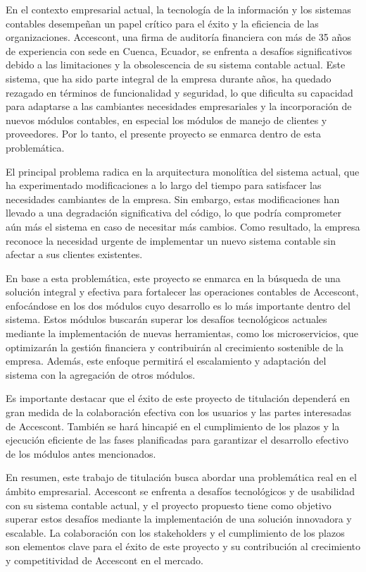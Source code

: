 \documentclass{article}
\begin{document}
 En el contexto empresarial actual, la tecnología de la información y los sistemas contables desempeñan un papel crítico para el éxito y la eficiencia de las organizaciones. Accescont, una firma de auditoría financiera con más de 35 años de experiencia con sede en Cuenca, Ecuador, se enfrenta a desafíos significativos debido a las limitaciones y la obsolescencia de su sistema contable actual. Este sistema, que ha sido parte integral de la empresa durante años, ha quedado rezagado en términos de funcionalidad y seguridad, lo que dificulta su capacidad para adaptarse a las cambiantes necesidades empresariales y la incorporación de nuevos módulos contables, en especial los módulos de manejo de clientes y proveedores. Por lo tanto, el presente proyecto se enmarca dentro de esta problemática.
 
 El principal problema radica en la arquitectura monolítica del sistema actual, que ha experimentado modificaciones a lo largo del tiempo para satisfacer las necesidades cambiantes de la empresa. Sin embargo, estas modificaciones han llevado a una degradación significativa del código, lo que podría comprometer aún más el sistema en caso de necesitar más cambios. Como resultado, la empresa reconoce la necesidad urgente de implementar un nuevo sistema contable sin afectar a sus clientes existentes.
 
 En base a esta problemática, este proyecto se enmarca en la búsqueda de una solución integral y efectiva para fortalecer las operaciones contables de Accescont, enfocándose en los dos módulos cuyo desarrollo es lo más importante dentro del sistema. Estos módulos buscarán superar los desafíos tecnológicos actuales mediante la implementación de nuevas herramientas, como los microservicios, que optimizarán la gestión financiera y contribuirán al crecimiento sostenible de la empresa. Además, este enfoque permitirá el escalamiento y adaptación del sistema con la agregación de otros módulos.
 
 Es importante destacar que el éxito de este proyecto de titulación dependerá en gran medida de la colaboración efectiva con los usuarios y las partes interesadas de Accescont. También se hará hincapié en el cumplimiento de los plazos y la ejecución eficiente de las fases planificadas para garantizar el desarrollo efectivo de los módulos antes mencionados.
 
 En resumen, este trabajo de titulación busca abordar una problemática real en el ámbito empresarial. Accescont se enfrenta a desafíos tecnológicos y de usabilidad con su sistema contable actual, y el proyecto propuesto tiene como objetivo superar estos desafíos mediante la implementación de una solución innovadora y escalable. La colaboración con los stakeholders y el cumplimiento de los plazos son elementos clave para el éxito de este proyecto y su contribución al crecimiento y competitividad de Accescont en el mercado.
 
\end{document}
